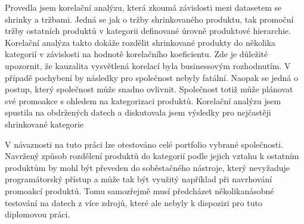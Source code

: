 Provedla jsem korelační analýzu, která zkoumá závislosti mezi datasetem se shrinky a tržbami. Jedná se jak o tržby shrinkovaného produktu, tak promoční tržby ostatních produktů v kategorii definované úrovně produktové hierarchie. Korelační analýza takto dokáže rozdělit shrinkované produkty do několika kategorií v závislosti na hodnotě korelačního koeficientu. Zde je důležité upozornit, že kauzalita vysvětlená korelací byla businessovým rozhodnutím. V případě pochybení by následky pro společnost nebyly fatální. Naopak se jedná o postup, který společnost může snadno ovlivnit.   Společnost totiž může plánovat své promoakce s ohledem na kategorizaci produktů. 
Korelační analýzu jsem spustila na obdržených datech a diskutovala jsem výsledky pro nejčastěji shrinkované kategorie  

V návaznosti na tuto práci lze otestováno celé portfolio vybrané společnosti.
Navržený způsob rozdělení produktů do kategorií podle jejich vztahu k ostatním produktům by mohl být převeden do soběstačného nástroje, který nevyžaduje programátorský přístup a může tak být využitý například při navrhování promoakcí produktů. Tomu samozřejmě musí předcházet několikanásobné testování na datech z více zdrojů, které ale nebyly k dispozizi pro tuto diplomovou práci.


